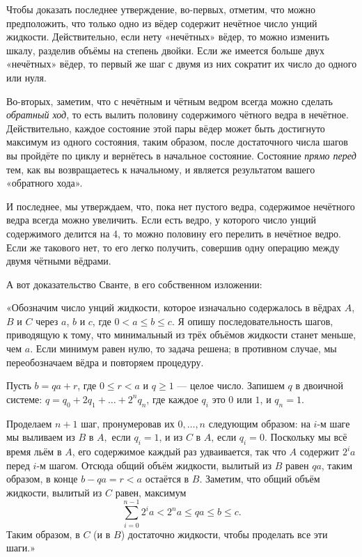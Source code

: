 Чтобы доказать последнее утверждение, во-первых, отметим, что можно предположить, что только одно из вёдер содержит нечётное число унций жидкости.
Действительно, если нету «нечётных» вёдер, то можно изменить шкалу, разделив объёмы на степень двойки.
Если же имеется больше двух «нечётных» вёдер, то первый же шаг с двумя из них сократит их число до одного или нуля.

Во-вторых, заметим, что с нечётным и чётным ведром всегда можно сделать \emph{обратный ход}, то есть вылить половину содержимого чётного ведра в нечётное.
Действительно, каждое состояние этой пары вёдер может быть достигнуто максимум из одного состояния, таким образом, после достаточного числа шагов вы пройдёте по циклу и вернётесь в начальное состояние.
Состояние \emph{прямо перед} тем, как вы возвращаетесь к начальному, и является результатом вашего «обратного хода».

И последнее, мы утверждаем, что, пока нет пустого ведра, содержимое нечётного ведра всегда можно увеличить.
Если есть ведро, у которого число унций содержимого делится на 4, то можно половину его перелить в нечётное ведро.
Если же такового нет, то его легко получить, совершив одну операцию между двумя чётными вёдрами.
\heart

А вот доказательство Сванте, в его собственном изложении:

\medskip

«Обозначим число унций жидкости, которое изначально содержалось в вёдрах $A$, $B$ и $C$ через $a$, $b$ и $c$, где $0<a\le b\le c$.
Я опишу последовательность шагов, приводящую к тому, что минимальный из трёх объёмов жидкости станет меньше, чем $a$.
Если минимум равен нулю, то задача решена; в противном случае, мы переобозначаем вёдра и повторяем процедуру.

Пусть $b = qa + r$, где $0\le r<a$ и $q\ge 1$ --- целое число.
Запишем $q$ в двоичной системе: $q=q_0+2q_1+\dots+2^nq_n$, где каждое $q_i$ это $0$ или $1$, и $q_n = 1$.

Проделаем $n+1$ шаг, пронумеровав их $0,\dots, n$ следующим образом: на $i$-м шаге  мы выливаем из $B$ в $A,$ если $q_i = 1$, и из $C$ в $A$, если $q_i = 0$.
Поскольку мы всё время льём в $A$, его содержимое каждый раз удваивается, так что $A$ содержит $2^ia$ перед $i$-м шагом.
Отсюда общий объём жидкости, вылитый из $B$ равен $qa$, таким образом, в конце $b-qa=r<a$ остаётся в $B$.
Заметим, что общий объём жидкости, вылитый из $C$ равен, максимум
\[\sum_{i=0}^{n-1} 2^ia<2^na\le qa\le b\le c.\]
Таким образом, в $C$ (и в $B$) достаточно жидкости, чтобы проделать все эти шаги.»
\heart

